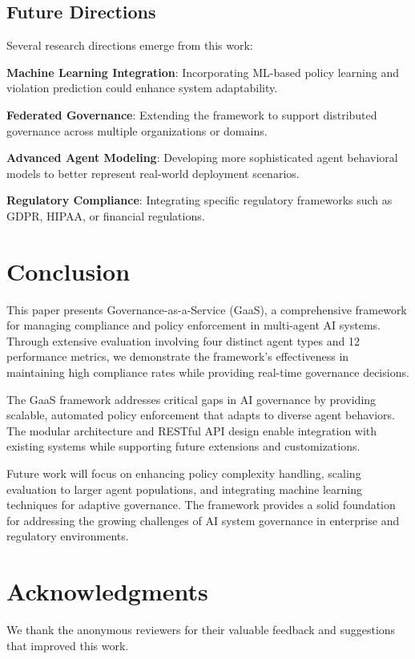 \documentclass[letterpaper]{article}
\begin{document}
\subsection{Future Directions}

Several research directions emerge from this work:

\textbf{Machine Learning Integration}: Incorporating ML-based policy learning and violation prediction could enhance system adaptability.

\textbf{Federated Governance}: Extending the framework to support distributed governance across multiple organizations or domains.

\textbf{Advanced Agent Modeling}: Developing more sophisticated agent behavioral models to better represent real-world deployment scenarios.

\textbf{Regulatory Compliance}: Integrating specific regulatory frameworks such as GDPR, HIPAA, or financial regulations.

\section{Conclusion}

This paper presents Governance-as-a-Service (GaaS), a comprehensive framework for managing compliance and policy enforcement in multi-agent AI systems. Through extensive evaluation involving four distinct agent types and 12 performance metrics, we demonstrate the framework's effectiveness in maintaining high compliance rates while providing real-time governance decisions.

The GaaS framework addresses critical gaps in AI governance by providing scalable, automated policy enforcement that adapts to diverse agent behaviors. The modular architecture and RESTful API design enable integration with existing systems while supporting future extensions and customizations.

Future work will focus on enhancing policy complexity handling, scaling evaluation to larger agent populations, and integrating machine learning techniques for adaptive governance. The framework provides a solid foundation for addressing the growing challenges of AI system governance in enterprise and regulatory environments.

\section*{Acknowledgments}

We thank the anonymous reviewers for their valuable feedback and suggestions that improved this work.



\end{document}
